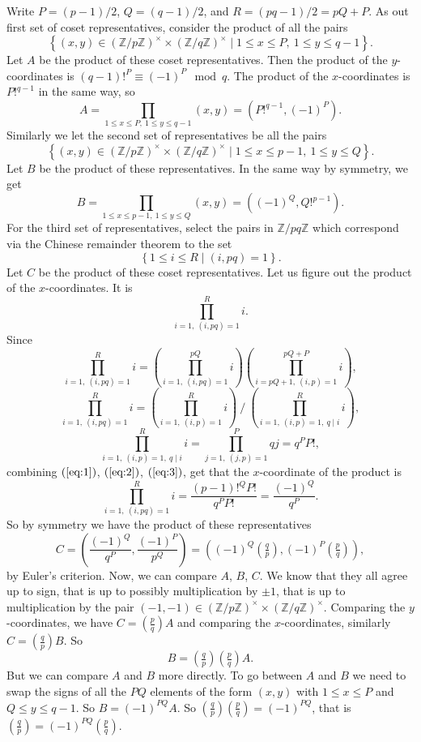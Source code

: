 \documentclass{article}
\newcommand{\Z}{\mathbb{Z}}
\newcommand{\rb}[1]{\left( #1 \right)}
\newcommand{\cb}[1]{\left\{ #1 \right\}}
\newcommand{\unit}[1]{\rb{\Z / #1\Z}^\times}
\newcommand{\legendre}[2]{\rb{\tfrac{#1}{#2}}}
\theoremstyle{definition}\newtheorem{definition}{Definition}
\theoremstyle{definition}\newtheorem*{remark}{Remark}
\theoremstyle{definition}\newtheorem*{example}{Example}
\theoremstyle{definition}\newtheorem*{note}{Note}
\begin{document}
Write $ P = \rb{p - 1} / 2 $, $ Q = \rb{q - 1} / 2 $, and $ R = \rb{pq - 1} / 2 = pQ + P $. As out first set of coset representatives, consider the product of all the pairs
$$ \cb{\rb{x, y} \in \unit{p} \times \unit{q} \mid 1 \le x \le P, \ 1 \le y \le q - 1}. $$ Let $ A $ be the product of these coset representatives. Then the product of the $ y $-coordinates is $ \rb{q - 1}!^P \equiv \rb{-1}^P \mod q $. The product of the $ x $-coordinates is $ P!^{q - 1} $ in the same way, so
$$ A = \prod_{1 \le x \le P, \ 1 \le y \le q - 1} \rb{x, y} = \rb{P!^{q - 1}, \rb{-1}^P}. $$
Similarly we let the second set of representatives be all the pairs
$$ \cb{\rb{x, y} \in \unit{p} \times \unit{q} \mid 1 \le x \le p - 1, \ 1 \le y \le Q}. $$
Let $ B $ be the product of these representatives. In the same way by symmetry, we get
$$ B = \prod_{1 \le x \le p - 1, \ 1 \le y \le Q} \rb{x, y} = \rb{\rb{-1}^Q, Q!^{p - 1}}. $$
For the third set of representatives, select the pairs in $ \Z / pq\Z $ which correspond via the Chinese remainder theorem to the set
$$ \cb{1 \le i \le R \mid \rb{i, pq} = 1}. $$
Let $ C $ be the product of these coset representatives. Let us figure out the product of the $ x $-coordinates. It is
$$ \prod_{i = 1, \ \rb{i, pq} = 1}^R i. $$
Since
\begin{equation}
\label{eq:1}
\prod_{i = 1, \ \rb{i, pq} = 1}^R i = \rb{\prod_{i = 1, \ \rb{i, pq} = 1}^{pQ} i}\rb{\prod_{i = pQ + 1, \ \rb{i, p} = 1}^{pQ + P} i},
\end{equation}
\begin{equation}
\label{eq:2}
\prod_{i = 1, \ \rb{i, pq} = 1}^R i = \rb{\prod_{i = 1, \ \rb{i, p} = 1}^R i} \ \Bigg/ \ \rb{\prod_{i = 1, \ \rb{i, p} = 1, \ q \mid i}^R i},
\end{equation}
\begin{equation}
\label{eq:3}
\prod_{i = 1, \ \rb{i, p} = 1, \ q \mid i}^{R} i = \prod_{j = 1, \ \rb{j, p} = 1}^{P} qj = q^PP!,
\end{equation}
combining $ \rb{\ref{eq:1}} $, $ \rb{\ref{eq:2}} $, $ \rb{\ref{eq:3}} $, get that the $ x $-coordinate of the product is
$$ \prod_{i = 1, \ \rb{i, pq} = 1}^R i = \dfrac{\rb{p - 1}!^QP!}{q^PP!} = \dfrac{\rb{-1}^Q}{q^P}. $$
So by symmetry we have the product of these representatives
$$ C = \rb{\dfrac{\rb{-1}^Q}{q^P}, \dfrac{\rb{-1}^P}{p^Q}} = \rb{\rb{-1}^Q\legendre{q}{p}, \rb{-1}^P\legendre{p}{q}}, $$
by Euler's criterion. Now, we can compare $ A $, $ B $, $ C $. We know that they all agree up to sign, that is up to possibly multiplication by $ \pm 1 $, that is up to multiplication by the pair $ \rb{-1, -1} \in \unit{p} \times \unit{q} $. Comparing the $ y $-coordinates, we have $ C = \legendre{p}{q}A $ and comparing the $ x $-coordinates, similarly $ C = \legendre{q}{p}B $. So
$$ B = \legendre{q}{p}\legendre{p}{q}A. $$
But we can compare $ A $ and $ B $ more directly. To go between $ A $ and $ B $ we need to swap the signs of all the $ PQ $ elements of the form $ \rb{x, y} $ with $ 1 \le x \le P $ and $ Q \le y \le q - 1 $. So $ B = \rb{-1}^{PQ}A $. So $ \legendre{q}{p}\legendre{p}{q} = \rb{-1}^{PQ} $, that is $ \legendre{q}{p} = \rb{-1}^{PQ}\legendre{p}{q} $.
\end{document}
